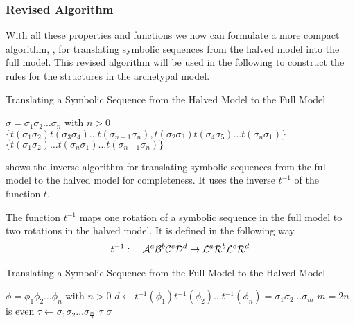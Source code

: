 \subsubsection{Revised Algorithm}

With all these properties and functions we now can formulate a more compact algorithm, , for translating symbolic sequences from the halved model into the full model.
This revised algorithm will be used in the following to construct the rules for the  structures in the archetypal model.

\begin{algorithm}
	\caption{Translating a Symbolic Sequence from the Halved Model to the Full Model}\label{alg:halved.to.full}
	\begin{algorithmic}
		\Require $\sigma = \sigma_1\sigma_2 \dots \sigma_n$ with $n > 0$
		\State \Return $\{t(\sigma_1\sigma_2) t(\sigma_3\sigma_4) \dots t(\sigma_{n-1}\sigma_n), t(\sigma_2\sigma_3) t(\sigma_4\sigma_5) \dots t(\sigma_n\sigma_1)\}$
		\State \Return $\{t(\sigma_1\sigma_2) \dots t(\sigma_{n}\sigma_1) \dots t(\sigma_{n-1}\sigma_n)\}$
		\EndIf
	\end{algorithmic}
\end{algorithm}

 shows the inverse algorithm for translating symbolic sequences from the full model to the halved model for completeness.
It uses the inverse $t^{-1}$ of the function $t$.

\begin{definition}
	The function $t^{-1}$ maps one rotation of a symbolic sequence in the full model to two rotations in the halved model.
	It is defined in the following way.
	\begin{align}
		t^{-1}: \quad \mathcal{A}^a\mathcal{B}^b\mathcal{C}^c\mathcal{D}^d \mapsto \mathcal{L}^a\mathcal{R}^b\mathcal{L}^c\mathcal{R}^d
	\end{align}
\end{definition}

\begin{algorithm}
	\caption{Translating a Symbolic Sequence from the Full Model to the Halved Model}\label{alg:full.to.halved}
	\begin{algorithmic}
		\Require $\phi = \phi_1\phi_2 \dots \phi_n$ with $n > 0$
		\State $d \gets t^{-1}(\phi_1)t^{-1}(\phi_2) \dots t^{-1}(\phi_n) = \sigma_1\sigma_2 \dots \sigma_m$
		\Comment $m = 2n$ is even
		\State $\tau \gets \sigma_1\sigma_2 \dots \sigma_{\frac{m}{2}}$
		\If{$\sigma = \tau^2$}
		\State \Return $\tau$
		\ElsIf{$\sigma \neq \tau^2$}
		\State \Return $\sigma$
		\EndIf
	\end{algorithmic}
\end{algorithm}
